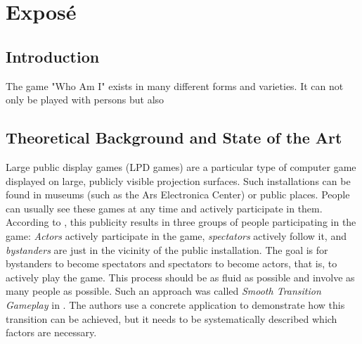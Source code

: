 \chapter{Exposé}

\section{Introduction}

\iffalse
The Deep Space 8K%
\footnote{\url{https://ars.electronica.art/center/en/exhibitions/deepspace/}}
at the Ars Electronica Center in Linz, with its $16 \times 9$~meter projection
surface, including position tracking, offers a unique opportunity to create
computer games. These games do not use classic control mechanisms such as a
keyboard, mouse, or gamepad; instead, the players themselves "control" the
content with their movements. Furthermore, these games take place in a
semi-public to public space, making it difficult to determine the target group
and the number of people playing. This bachelor thesis (master thesis)
illuminates this problem and presents concrete solutions based on an example.
\fi

The game "Who Am I" exists in many different forms and varieties. It can not only be played with persons but also 


\section{Theoretical Background and State of the Art}
\label{sec:state-of-the-art}

Large public display games (LPD games) are a particular type of computer game
displayed on large, publicly visible projection surfaces. Such installations can
be found in museums (such as the Ars Electronica Center) or public places.
People can usually see these games at any time and actively participate in them.
According to \cite{Finke2008}, this publicity results in three groups of people
participating in the game: \emph{Actors} actively participate in the game,
\emph{spectators} actively follow it, and \emph{bystanders} are just in the
vicinity of the public installation. The goal is for bystanders to become
spectators and spectators to become actors, that is, to actively play the game.
This process should be as fluid as possible and involve as many people as
possible. Such an approach was called \emph{Smooth Transition Gameplay} in
\cite{Hochleitner2013}. The authors use a concrete application to demonstrate
how this transition can be achieved, but it needs to be systematically described
which factors are necessary.

